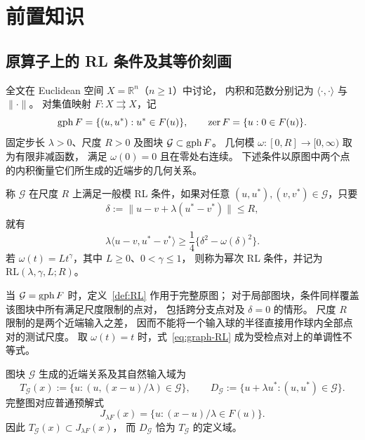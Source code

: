 \section{前置知识}
\label{sec:preliminaries}

\subsection{原算子上的 RL 条件及其等价刻画}
\label{subsec:RL-definition}

全文在 Euclidean 空间 $X=\mathbb R^n$（$n\ge1$）中讨论，
内积和范数分别记为 $\langle\cdot,\cdot\rangle$ 与 $\|\cdot\|$。
对集值映射 $F:X\rightrightarrows X$，记
\[
 \operatorname{gph} F=\{(u,u^*):u^*\in F(u)\},\qquad
 \operatorname{zer} F=\{u:0\in F(u)\}.
\]
固定步长 $\lambda>0$、尺度 $R>0$ 及图块
$\mathcal G\subset\operatorname{gph} F$。
几何模 $\omega:[0,R]\to[0,\infty)$ 取为有限非减函数，
满足 $\omega(0)=0$ 且在零处右连续。
下述条件以原图中两个点的内积衡量它们所生成的近端步的几何关系。

\begin{definition}
\label{def:RL}
\label{def:graph-RL}
称 $\mathcal G$ 在尺度 $R$ 上满足一般模 RL 条件，如果对任意
$(u,u^*),(v,v^*)\in\mathcal G$，只要
\[
 \delta:=\|u-v+\lambda(u^*-v^*)\|\le R,
\]
就有
\begin{equation}
 \lambda\langle u-v,u^*-v^*\rangle
 \ge\frac14\bigl\{\delta^2-\omega(\delta)^2\bigr\}.
 \label{eq:graph-RL}
\end{equation}
若 $\omega(t)=Lt^\gamma$，其中 $L\ge0$、$0<\gamma\le1$，
则称为幂次 RL 条件，并记为 $\mathrm{RL}(\lambda,\gamma,L;R)$。
\end{definition}

当 $\mathcal G=\operatorname{gph} F$ 时，定义~\ref{def:RL} 作用于完整原图；
对于局部图块，条件同样覆盖该图块中所有满足尺度限制的点对，
包括跨分支点对及 $\delta=0$ 的情形。
尺度 $R$ 限制的是两个近端输入之差，
因而不能将一个输入球的半径直接用作球内全部点对的测试尺度。
取 $\omega(t)=t$ 时，式~\eqref{eq:graph-RL}
成为受检点对上的单调性不等式。

图块 $\mathcal G$ 生成的近端关系及其自然输入域为
\[
 T_{\mathcal G}(x)
 :=\{u:(u,(x-u)/\lambda)\in\mathcal G\},\qquad
 D_{\mathcal G}:=\{u+\lambda u^*:(u,u^*)\in\mathcal G\}.
\]
完整图对应普通预解式
\[
 J_{\lambda F}(x)=\{u:(x-u)/\lambda\in F(u)\}.
\]
因此 $T_{\mathcal G}(x)\subset J_{\lambda F}(x)$，
而 $D_{\mathcal G}$ 恰为 $T_{\mathcal G}$ 的定义域。

